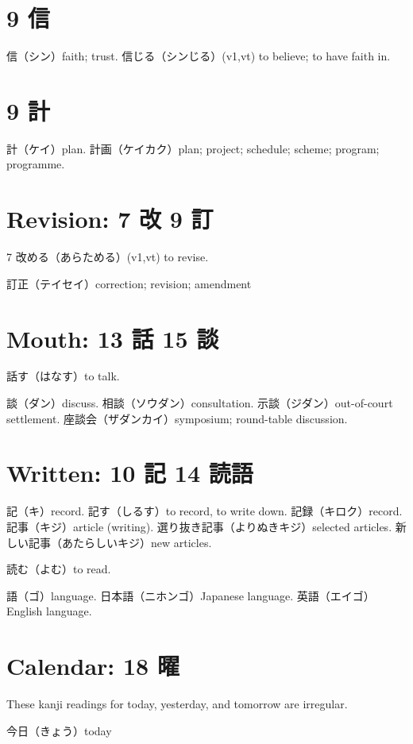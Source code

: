 \section{9 信}

信（シン）faith; trust.
信じる（シンじる）(v1,vt) to believe; to have faith in.

\section{9 計}

計（ケイ）plan.
計画（ケイカク）plan; project; schedule; scheme; program; programme.

\section{Revision: 7 改 9 訂}

7 改める（あらためる）(v1,vt) to revise.

訂正（テイセイ）correction; revision; amendment

\section{Mouth: 13 話 15 談}

話す（はなす）to talk.

談（ダン）discuss.
相談（ソウダン）consultation.
示談（ジダン）out-of-court settlement.
座談会（ザダンカイ）symposium; round-table discussion.

\section{Written: 10 記 14 読語}

記（キ）record.
記す（しるす）to record, to write down.
記録（キロク）record.
記事（キジ）article (writing).
選り抜き記事（よりぬきキジ）selected articles.
新しい記事（あたらしいキジ）new articles.

読む（よむ）to read.

語（ゴ）language.
日本語（ニホンゴ）Japanese language.
英語（エイゴ）English language.

\section{Calendar: 18 曜}

These kanji readings for today, yesterday, and tomorrow are irregular.

今日（きょう）today

